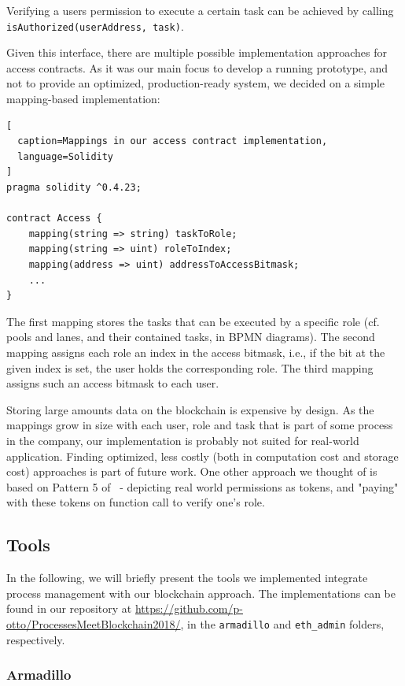 \documentclass[runningheads]{llncs}
\begin{document}
Verifying a users permission to execute a certain task can be achieved by calling \texttt{isAuthorized(userAddress, task)}.
\newline

Given this interface, there are multiple possible implementation approaches for access contracts.
As it was our main focus to develop a running prototype, and not to provide an optimized, production-ready system, we decided on a simple mapping-based implementation:
\begin{lstlisting}[
  caption=Mappings in our access contract implementation,
  language=Solidity
]
pragma solidity ^0.4.23;

contract Access {
    mapping(string => string) taskToRole;
    mapping(string => uint) roleToIndex;
    mapping(address => uint) addressToAccessBitmask;
    ...
}
\end{lstlisting}
The first mapping stores the tasks that can be executed by a specific role (cf. pools and lanes, and their contained tasks, in BPMN diagrams).
The second mapping assigns each role an index in the access bitmask, i.e., if the bit at the given index is set, the user holds the corresponding role.
The third mapping assigns such an access bitmask to each user.

Storing large amounts data on the blockchain is expensive by design.
As the mappings grow in size with each user, role and task that is part of some process in the company, our implementation is probably not suited for real-world application.
Finding optimized, less costly (both in computation cost and storage cost) approaches is part of future work.
One other approach we thought of is based on Pattern 5 of~\cite{xu2018pattern} - depicting real world permissions as tokens, and "paying" with these tokens on function call to verify one's role.

\subsection{Tools}

In the following, we will briefly present the tools we implemented integrate process management with our blockchain approach.
The implementations can be found in our repository at \url{https://github.com/p-otto/ProcessesMeetBlockchain2018/}, in the \texttt{armadillo} and \texttt{eth\_admin} folders, respectively.


\subsubsection{Armadillo}
\end{document}
